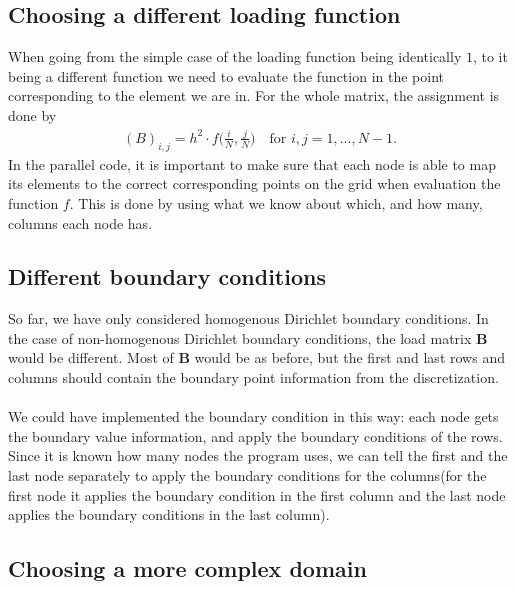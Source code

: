 \subsection*{Choosing a different loading function}
When going from the simple case of the loading function being identically $1$, to it being a different function we need to evaluate the function in the point corresponding to the element we are in. For the whole matrix, the assignment is done by
\begin{align*}
	(B)_{i,j} = h^2\cdot f\Big(\frac{i}{N},\frac{j}{N}\Big) \quad \text{for } i,j = 1,...,N-1.
\end{align*}
In the parallel code, it is important to make sure that each node is able to map its elements to the correct corresponding points on the grid when evaluation the function $f$. This is done by using what we know about which, and how many, columns each node has.

\subsection*{Different boundary conditions}

So far, we have only considered homogenous Dirichlet boundary conditions. In the case of non-homogenous Dirichlet boundary conditions, the load matrix $\mathbf{B}$ would be different. Most of $\mathbf{B}$ would be as before, but the first and last rows and columns should contain the boundary point information from the discretization. \\
\\
We could have implemented the boundary condition in this way: each node gets the boundary value information, and apply the boundary conditions of the rows. Since it is known how many nodes the program uses, we can tell the first and the last node separately to apply the boundary conditions for the columns(for the first node it applies the boundary condition in the first column and the last node applies the boundary conditions in the last column).

\subsection*{Choosing a more complex domain}

